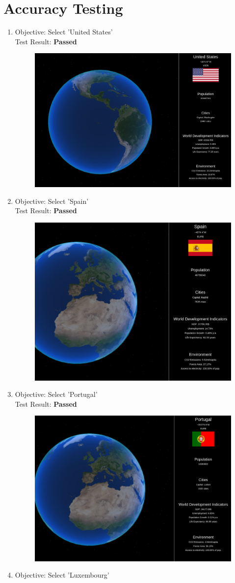 \section{Accuracy Testing}
\begin{enumerate}
    \item Objective: Select 'United States' \\
        Test Result: \textbf{Passed}
\begin{figure}[h]
\centering
\includegraphics[width=0.4\linewidth]{images/usa}
\end{figure}
    \item Objective: Select 'Spain' \\
        Test Result: \textbf{Passed}
\begin{figure}[ht]
\centering
\includegraphics[width=0.4\linewidth]{images/spain}
\end{figure}
    \item Objective: Select 'Portugal' \\
        Test Result: \textbf{Passed}
\begin{figure}[ht]
\centering
\includegraphics[width=0.4\linewidth]{images/pt}
\end{figure}
\newpage
    \item Objective: Select 'Luxembourg' \\

\end{enumerate}
